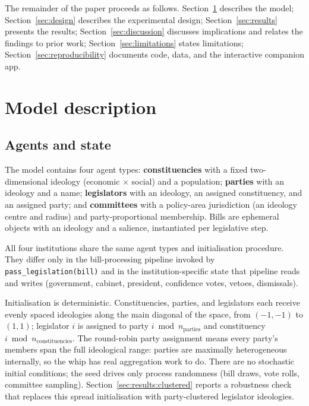 \documentclass[11pt]{article}
\begin{document}
The remainder of the paper proceeds as follows.
Section~\ref{sec:model} describes the model;
Section~\ref{sec:design} describes the experimental design;
Section~\ref{sec:results} presents the results;
Section~\ref{sec:discussion} discusses implications and relates the
findings to prior work; Section~\ref{sec:limitations} states limitations;
Section~\ref{sec:reproducibility} documents code, data, and the
interactive companion app.

\section{Model description}
\label{sec:model}

\subsection{Agents and state}
The model contains four agent types:
\textbf{constituencies} with a fixed two-dimensional ideology (economic
$\times$ social) and a population;
\textbf{parties} with an ideology and a name;
\textbf{legislators} with an ideology, an assigned constituency, and an
assigned party; and
\textbf{committees} with a policy-area jurisdiction (an ideology centre
and radius) and party-proportional membership.
Bills are ephemeral objects with an ideology and a salience, instantiated
per legislative step.

All four institutions share the same agent types and initialisation
procedure. They differ only in the bill-processing pipeline invoked by
\texttt{pass\_legislation(bill)} and in the institution-specific state that
pipeline reads and writes (government, cabinet, president, confidence votes,
vetoes, dismissals).

Initialisation is deterministic. Constituencies, parties, and legislators
each receive evenly spaced ideologies along the main diagonal of the space,
from $(-1,-1)$ to $(1,1)$; legislator $i$ is assigned to party $i \bmod
n_{\text{parties}}$ and constituency $i \bmod n_{\text{constituencies}}$.
The round-robin party assignment means every party's members span the full
ideological range: parties are maximally heterogeneous internally, so the
whip has real aggregation work to do. There are no stochastic initial
conditions; the seed drives only process randomness (bill draws, vote
rolls, committee sampling). Section~\ref{sec:results:clustered} reports a
robustness check that replaces this spread initialisation with
party-clustered legislator ideologies.
\end{document}
